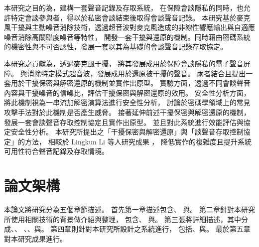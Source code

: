     本研究之目的為，建構一套聲音記錄及存取系統，
在保障會談隱私的同時，也允許特定會談參與者，得以於私密會談結束後取得會談聲音記錄。
本研究基於麥克風干擾與主動噪音消除技術，透過超音波對麥克風造成的非線性響應輸出與自適應噪音消除高關聯度噪音等特性，
開發一套干擾與還原的機制。同時藉由密碼系統的機密性與不可否認性，發展一套以其為基礎的會談聲音記錄存取協定。

本研究之貢獻為，透過麥克風干擾\cite{chen2020wearable}\cite{roy2017backdoor}，
將其發展成用於保障會談隱私的電子聲音屏障。
與消除特定模式超音波\cite{he2019canceling}，發展成用於還原被干擾的聲音。
兩者結合且提出一套用於干擾保密與解密還原的機制並實作出原型。
實驗方面，透過不同會談聲音內容與干擾噪音的信噪比，評估干擾保密與解密還原的效用。
安全性分析方面，將此機制視為一串流加解密演算法進行安全性分析，
討論於密碼學領域上的常見攻擊手法對於此機制是否產生威脅。
接著延伸前述干擾保密與解密還原的機制，發展一套會談聲音存取控制協定且實作出原型。
並且對此系統進行效能評估與協定安全性分析。
本研究所提出之「干擾保密與解密還原」與「談聲音存取控制協定」的方法，
相較於 Lingkun Li 等人研究成果 \cite{li2020patronus}，
降低實作的複雜度且提升系統可用性符合聲音記錄及存取情境。


\section{論文架構}\label{section:intro-arch}

    本論文將研究分為五個章節描述。
首先第一章描述包含、
與。
第二章針對本研究所使用相關技術的背景做介紹與整理，
包含、
與。
第三張將詳細描述，其中分成、、
、、與。
第四章則針對本研究所設計之系統進行，
包括、與。
最於第五章對本研究成果進行。